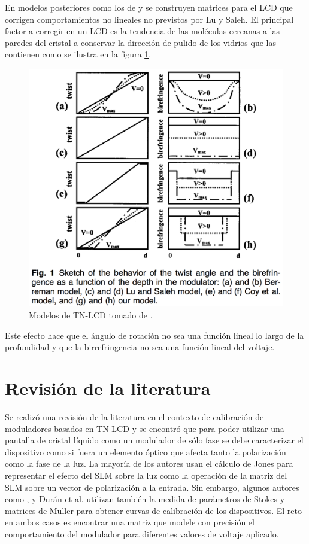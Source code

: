 En modelos posteriores como los de  y
 se construyen matrices para el LCD que
corrigen comportamientos no lineales no previstos por  Lu y Saleh. El
principal factor a corregir en un LCD es la tendencia de las moléculas
cercanas a las paredes del cristal a conservar la dirección de pulido
de los vidrios que las contienen como se ilustra en la figura \ref{fig:lcd_models}.
\begin{figure}[h!]
\centering
\includegraphics[scale=.5]{lcd_models}
\caption[Modelos de TN-LCD]{Modelos de TN-LCD tomado de .}
\label{fig:lcd_models}
\end{figure}
 Este efecto hace que el ángulo de
rotación no sea una función lineal  lo largo de la profundidad y que la
birrefringencia no sea una función lineal del voltaje.

\section{Revisión de la literatura}
Se realizó una revisión de la literatura en el contexto de calibración
de moduladores basados en TN-LCD y se encontró que para poder utilizar
una pantalla de cristal líquido como un modulador de sólo fase se debe
caracterizar el dispositivo como si fuera un elemento óptico que
afecta tanto la polarización como la fase de la luz. La mayoría de los
autores usan el cálculo de Jones para representar el efecto del SLM
sobre la luz como la operación de la matriz del SLM sobre un vector de
polarización a la entrada. Sin embargo, algunos autores como ,  y Durán et al.  utilizan también
la medida de parámetros de  Stokes y matrices de Muller para obtener
curvas de calibración de los dispositivos. El reto en ambos casos es
encontrar una matriz que 
modele con precisión el comportamiento del modulador para diferentes
valores de voltaje aplicado. 

